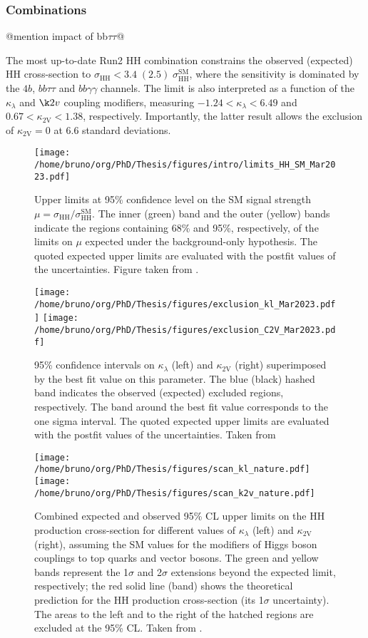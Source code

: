 \documentclass[11pt]{article}
\newcommand{\kl}{\kappa_{\lambda}}
\newcommand{\kvv}{\kappa_{\text{2V}}}
\newcommand{\xshhsm}{\sigma_{\text{HH}}^{\text{SM}}}
\newcommand{\xshh}{\sigma_{\text{HH}}}
\begin{document}
\subsubsection{Combinations}
\label{sec:org7585f95}
\label{sec:Combinations}

@mention impact of bb\(\tau \tau\)@

The most up-to-date Run2 HH combination constrains the observed (expected) HH cross-section to \(\xshh < 3.4\;(2.5)\;\xshhsm\), where the sensitivity is dominated by the \(4b\), \(bb\tau\tau\) and \(bb\gamma\gamma\) channels. The limit is also interpreted as a function of the \(\kl\) and \(\k2v\) coupling modifiers, measuring \(-1.24 < \kl < 6.49\) and \(0.67 < \kvv < 1.38\), respectively. Importantly, the latter result allows the exclusion of \(\kvv=0\) at 6.6 standard deviations.

\begin{figure}[htbp]
\centering
\texttt{[image: /home/bruno/org/PhD/Thesis/figures/intro/limits\_HH\_SM\_Mar2023.pdf]}
\caption{\label{fig:HH_nonres_comb_xsec}Upper limits at 95\% confidence level on the SM signal strength \(\mu = \xshh / \xshhsm\). The inner (green) band and the outer (yellow) bands indicate the regions containing 68\% and 95\%, respectively, of the limits on \(\mu\) expected under the background-only hypothesis. The quoted expected upper limits are evaluated with the postfit values of the uncertainties. Figure taken from \cite{summary_hig_twiki}.}
\end{figure}

\begin{figure}
\texttt{[image: /home/bruno/org/PhD/Thesis/figures/exclusion\_kl\_Mar2023.pdf]}
\texttt{[image: /home/bruno/org/PhD/Thesis/figures/exclusion\_C2V\_Mar2023.pdf]}
\caption{\label{fig:HH_nonres_comb_c2v}95\% confidence intervals on \(\kl\) (left) and \(\kvv\) (right) superimposed by the best fit value on this parameter. The blue (black) hashed band indicates the observed (expected) excluded regions, respectively. The band around the best fit value corresponds to the one sigma interval. The quoted expected upper limits are evaluated with the postfit values of the uncertainties. Taken from}
\end{figure}

\begin{figure}
\texttt{[image: /home/bruno/org/PhD/Thesis/figures/scan\_kl\_nature.pdf]}
\texttt{[image: /home/bruno/org/PhD/Thesis/figures/scan\_k2v\_nature.pdf]}
\caption{\label{fig:scan_comb_cms_nature}Combined expected and observed 95\% CL upper limits on the HH production cross-section for different values of \(\kl\) (left) and \(\kvv\) (right), assuming the SM values for the modifiers of Higgs boson couplings to top quarks and vector bosons. The green and yellow bands represent the 1\(\sigma\) and 2\(\sigma\) extensions beyond the expected limit, respectively; the red solid line (band) shows the theoretical prediction for the HH production cross-section (its 1\(\sigma\) uncertainty). The areas to the left and to the right of the hatched regions are excluded at the 95\% CL. Taken from \cite{higgs_10_years}.}
\end{figure}
\end{document}

